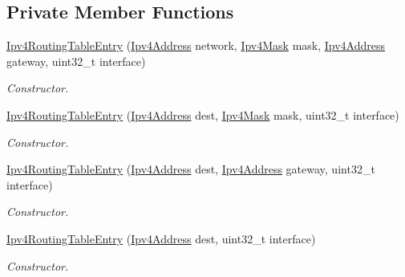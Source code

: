 \subsection*{Private Member Functions}
\begin{DoxyCompactItemize}
\item 
\hyperlink{classns3_1_1Ipv4RoutingTableEntry_a6dae5b7be1e7ee89cdd1074558da7c53}{Ipv4\+Routing\+Table\+Entry} (\hyperlink{classns3_1_1Ipv4Address}{Ipv4\+Address} network, \hyperlink{classns3_1_1Ipv4Mask}{Ipv4\+Mask} mask, \hyperlink{classns3_1_1Ipv4Address}{Ipv4\+Address} gateway, uint32\+\_\+t interface)
\begin{DoxyCompactList}\small\item\em Constructor. \end{DoxyCompactList}\item 
\hyperlink{classns3_1_1Ipv4RoutingTableEntry_af1f27e2f417e69e5486cb509f615b927}{Ipv4\+Routing\+Table\+Entry} (\hyperlink{classns3_1_1Ipv4Address}{Ipv4\+Address} dest, \hyperlink{classns3_1_1Ipv4Mask}{Ipv4\+Mask} mask, uint32\+\_\+t interface)
\begin{DoxyCompactList}\small\item\em Constructor. \end{DoxyCompactList}\item 
\hyperlink{classns3_1_1Ipv4RoutingTableEntry_ab91e5d73c0387abc0860388c5567576a}{Ipv4\+Routing\+Table\+Entry} (\hyperlink{classns3_1_1Ipv4Address}{Ipv4\+Address} dest, \hyperlink{classns3_1_1Ipv4Address}{Ipv4\+Address} gateway, uint32\+\_\+t interface)
\begin{DoxyCompactList}\small\item\em Constructor. \end{DoxyCompactList}\item 
\hyperlink{classns3_1_1Ipv4RoutingTableEntry_ad51c2ceb86ff1d9f928db197f8486e93}{Ipv4\+Routing\+Table\+Entry} (\hyperlink{classns3_1_1Ipv4Address}{Ipv4\+Address} dest, uint32\+\_\+t interface)
\begin{DoxyCompactList}\small\item\em Constructor. \end{DoxyCompactList}\end{DoxyCompactItemize}

